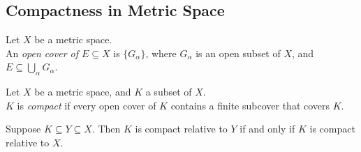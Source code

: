 \subsection{Compactness in Metric Space} \label{sec:}

\begin{definition}
Let $X$ be a metric space. \\An \textit{open cover of $E \subseteq X$} is $\{ G_{\alpha}\}$, where $G_{\alpha}$ is an open subset of $X$, and $E \subseteq \bigcup_{\alpha}G_{\alpha}$.
\end{definition}

\begin{definition}[Compact]
Let $X$ be a metric space, and $K$ a subset of $X$.
\\ $K$ is \textit{compact} if every open cover of $K$ contains a finite subcover that covers $K$.
\end{definition}

\begin{prop}
Suppose $K \subseteq Y \subseteq X$. Then $K$ is compact relative to $Y$ if and only if $K$ is compact relative to $X$.
\end{prop}





